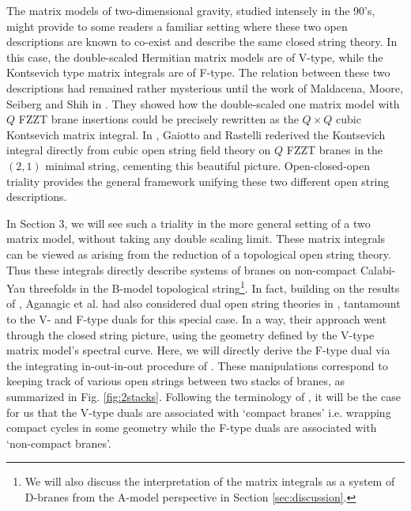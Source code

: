 \documentclass[english]{article}
\begin{document}
The matrix models of two-dimensional gravity, studied intensely in the 90's, might provide to some readers a familiar setting where these two open descriptions are known to co-exist and describe the same closed string theory. In this case, the double-scaled Hermitian matrix models \cite{ginsparg1993lectures, gross-migdal, brezin1990exactly, douglas1990strings} are of V-type, while the Kontsevich type matrix integrals \cite{KontsevichAiry,DijkgraafIntersectionNotes, mukhireview} are of F-type. The relation between these two descriptions had remained rather mysterious until the work of Maldacena, Moore, Seiberg and Shih in \cite{exact}. They showed how the double-scaled one matrix model with $Q$ FZZT brane insertions could be precisely rewritten as the $Q \times Q$ cubic Kontsevich matrix integral. In \cite{Gaiotto:2003yb}, Gaiotto and Rastelli rederived the Kontsevich integral directly from cubic open string field theory on $Q$ FZZT branes in the $(2,1)$ minimal string, cementing this beautiful picture. Open-closed-open triality provides the general framework unifying these two different open string descriptions. 

In Section 3, we will see such a triality in the more general setting of a two matrix model,  without taking any double scaling limit. These matrix integrals can be viewed as arising from the reduction of a topological open string theory. Thus these integrals directly describe systems of branes on non-compact Calabi-Yau threefolds in the B-model topological string\footnote{We will also discuss the interpretation of the matrix integrals as a system of D-branes from the A-model perspective in Section \ref{sec:discussion}.}.
In fact, building on the results of \cite{DijkgraafVafa02}, Aganagic et al. had also considered dual open string theories in \cite{Aganagic_2005}, tantamount to the V- and F-type duals for this special case. In a way, their approach went through the closed string picture, using the geometry defined by the V-type matrix model's spectral curve. Here, we will directly derive the F-type dual via the  integrating in-out-in-out procedure of \cite{exact}. These manipulations correspond to keeping track of various open strings between two stacks of branes, as summarized in Fig. \ref{fig:2stacks}.
Following the terminology of \cite{Aganagic_2005}, it will be the case for us that the V-type duals are associated with `compact branes' i.e. wrapping compact cycles in some geometry while the F-type duals are associated with `non-compact branes'. 
\end{document}
